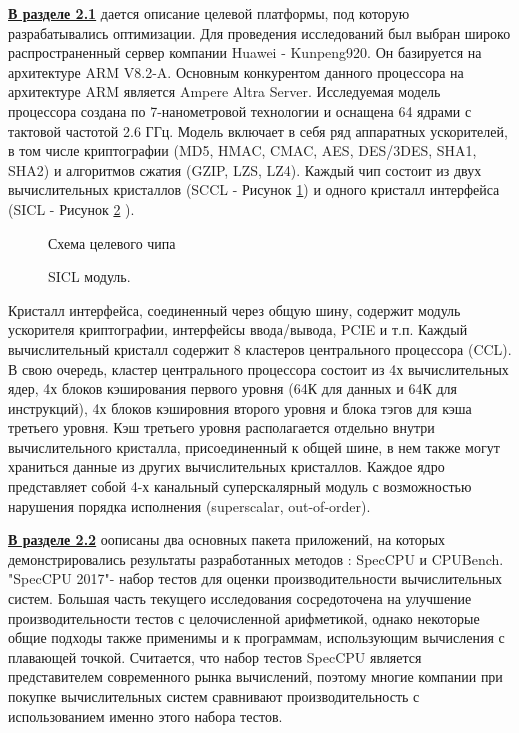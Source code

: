 \underline{\textbf{В разделе 2.1}}
дается описание целевой платформы, под которую разрабатывались
оптимизации. Для проведения исследований был выбран широко распространенный сервер компании Huawei - Kunpeng920. Он базируется на архитектуре ARM V8.2-A.  Основным конкурентом данного процессора на архитектуре ARM является Ampere Altra Server.  Исследуемая модель процессора создана по 7-нанометровой технологии и оснащена 64 ядрами с тактовой частотой 2.6 ГГц. Модель включает в себя  ряд аппаратных ускорителей, в том числе криптографии (MD5, HMAC, CMAC, AES, DES/3DES,  SHA1, SHA2) и  алгоритмов сжатия (GZIP, LZS, LZ4). 
Каждый чип состоит из двух вычислительных кристаллов (SCCL - Рисунок
\ref{chip1}) и одного кристалл интерфейса (SICL - Рисунок \ref{chip2} ).

\begin{figure}[htbp]
	\centering
	
	\caption{Схема целевого чипа}
	\label{chip1}
\end{figure}
\begin{figure}[htbp]
	\centering
	
	\caption{SICL модуль.}
	\label{chip2}
\end{figure}



Кристалл
интерфейса, соединенный через общую шину, содержит модуль ускорителя
криптографии, интерфейсы ввода/вывода, PCIE и т.п. Каждый вычислительный
кристалл содержит 8 кластеров центрального процессора (CCL). В свою
очередь, кластер центрального процессора состоит из 4х вычислительных ядер,
4х блоков кэширования первого уровня (64К для данных и 64К для инструкций),
4х блоков кэшировния второго уровня и блока тэгов для кэша третьего
уровня. Кэш третьего уровня располагается отдельно внутри вычислительного
кристалла, присоединенный к общей шине, в нем также могут храниться данные
из других вычислительных кристаллов. Каждое ядро представляет собой
4-х канальный суперскалярный модуль с возможностью нарушения порядка
исполнения (superscalar, out-of-order).



\underline{\textbf{В разделе 2.2}} оописаны два основных пакета приложений, на которых демонстрировались результаты разработанных методов : SpecCPU и CPUBench. "SpecCPU 2017"\phantom{ }- набор тестов для оценки производительности вычислительных
систем. Большая часть текущего исследования сосредоточена
на улучшение производительности тестов с целочисленной арифметикой,
однако некоторые общие подходы также применимы и к программам, использующим
вычисления с плавающей точкой. Считается, что набор тестов
SpecCPU является представителем современного рынка вычислений, поэтому
многие компании при покупке вычислительных систем сравнивают производительность
с использованием именно этого набора тестов. 

